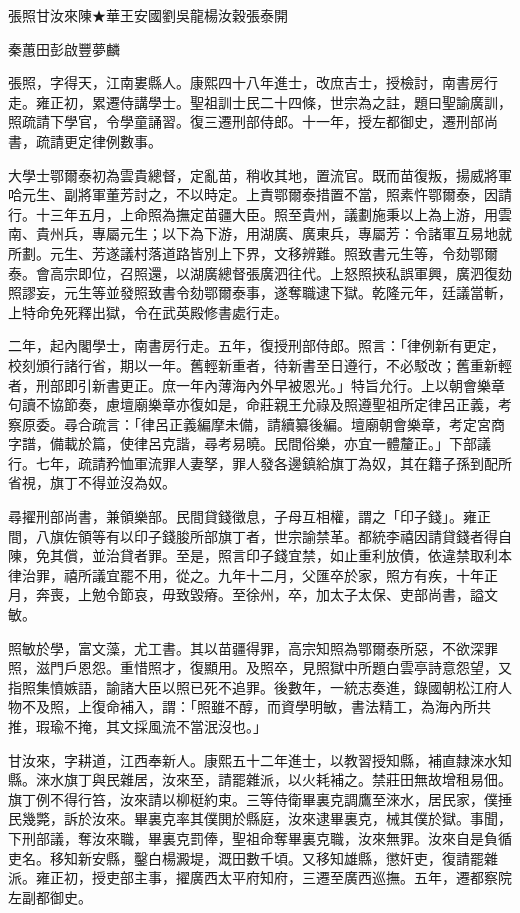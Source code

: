 
\begin{pinyinscope}
張照甘汝來陳★華王安國劉吳龍楊汝穀張泰開

秦蕙田彭啟豐夢麟

張照，字得天，江南婁縣人。康熙四十八年進士，改庶吉士，授檢討，南書房行走。雍正初，累遷侍講學士。聖祖訓士民二十四條，世宗為之註，題曰聖諭廣訓，照疏請下學官，令學童誦習。復三遷刑部侍郎。十一年，授左都御史，遷刑部尚書，疏請更定律例數事。

大學士鄂爾泰初為雲貴總督，定亂苗，稍收其地，置流官。既而苗復叛，揚威將軍哈元生、副將軍董芳討之，不以時定。上責鄂爾泰措置不當，照素忤鄂爾泰，因請行。十三年五月，上命照為撫定苗疆大臣。照至貴州，議劃施秉以上為上游，用雲南、貴州兵，專屬元生；以下為下游，用湖廣、廣東兵，專屬芳：令諸軍互易地就所劃。元生、芳遂議村落道路皆別上下界，文移辨難。照致書元生等，令劾鄂爾泰。會高宗即位，召照還，以湖廣總督張廣泗往代。上怒照挾私誤軍興，廣泗復劾照謬妄，元生等並發照致書令劾鄂爾泰事，遂奪職逮下獄。乾隆元年，廷議當斬，上特命免死釋出獄，令在武英殿修書處行走。

二年，起內閣學士，南書房行走。五年，復授刑部侍郎。照言：「律例新有更定，校刻頒行諸行省，期以一年。舊輕新重者，待新書至日遵行，不必駁改；舊重新輕者，刑部即引新書更正。庶一年內薄海內外早被恩光。」特旨允行。上以朝會樂章句讀不協節奏，慮壇廟樂章亦復如是，命莊親王允祿及照遵聖祖所定律呂正義，考察原委。尋合疏言：「律呂正義編摩未備，請續纂後編。壇廟朝會樂章，考定宮商字譜，備載於篇，使律呂克諧，尋考易曉。民間俗樂，亦宜一體釐正。」下部議行。七年，疏請矜恤軍流罪人妻孥，罪人發各邊鎮給旗丁為奴，其在籍子孫到配所省視，旗丁不得並沒為奴。

尋擢刑部尚書，兼領樂部。民間貸錢徵息，子母互相權，謂之「印子錢」。雍正間，八旗佐領等有以印子錢朘所部旗丁者，世宗諭禁革。都統李禧因請貸錢者得自陳，免其償，並治貸者罪。至是，照言印子錢宜禁，如止重利放債，依違禁取利本律治罪，禧所議宜罷不用，從之。九年十二月，父匯卒於家，照方有疾，十年正月，奔喪，上勉令節哀，毋致毀瘠。至徐州，卒，加太子太保、吏部尚書，謚文敏。

照敏於學，富文藻，尤工書。其以苗疆得罪，高宗知照為鄂爾泰所惡，不欲深罪照，滋門戶恩怨。重惜照才，復顯用。及照卒，見照獄中所題白雲亭詩意怨望，又指照集憤嫉語，諭諸大臣以照已死不追罪。後數年，一統志奏進，錄國朝松江府人物不及照，上復命補入，謂：「照雖不醇，而資學明敏，書法精工，為海內所共推，瑕瑜不掩，其文採風流不當泯沒也。」

甘汝來，字耕道，江西奉新人。康熙五十二年進士，以教習授知縣，補直隸淶水知縣。淶水旗丁與民雜居，汝來至，請罷雜派，以火耗補之。禁莊田無故增租易佃。旗丁例不得行笞，汝來請以柳梃約束。三等侍衛畢裏克調鷹至淶水，居民家，僕捶民幾斃，訴於汝來。畢裏克率其僕閧於縣庭，汝來逮畢裏克，械其僕於獄。事聞，下刑部議，奪汝來職，畢裏克罰俸，聖祖命奪畢裏克職，汝來無罪。汝來自是負循吏名。移知新安縣，鑿白楊澱堤，溉田數千頃。又移知雄縣，懲奸吏，復請罷雜派。雍正初，授吏部主事，擢廣西太平府知府，三遷至廣西巡撫。五年，遷都察院左副都御史。


\end{pinyinscope}
